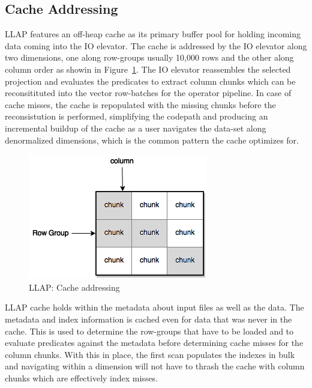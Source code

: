 \subsection{Cache Addressing}

LLAP features an off-heap cache as its primary buffer pool for holding incoming data coming into
the IO elevator. The cache is addressed by the IO elevator along two dimensions, one along row-groups usually 10,000 rows and
the other along column order as showin in Figure~\ref{fig:cache_chunks}. The IO elevator reassembles the selected projection
and evaluates the predicates to extract column chunks which can be reconsitituted into the vector row-batches for the operator
pipeline. In case of cache misses, the cache is repopulated with the missing chunks before the reconsistution is performed,
simplifying the codepath and producing an incremental buildup of the cache as a user navigates the data-set along denormalized
dimensions, which is the common pattern the cache optimizes for.

\begin{figure}[ht]
\centering
\includegraphics[width=0.8\columnwidth]{figures/cache-groups.png}
\caption{LLAP: Cache addressing}
\label{fig:cache_chunks}
\end{figure} 

LLAP cache holds within the metadata about input files as well as the data. The metadata and index information is cached even 
for data that was never in the cache. This is used to determine the row-groups that have to be loaded and to evaluate predicates
against the metadata before determining cache misses for the column chunks. With this in place, the first scan populates the indexes
in bulk and navigating within a dimension will not have to thrash the cache with column chunks which are effectively index misses.

